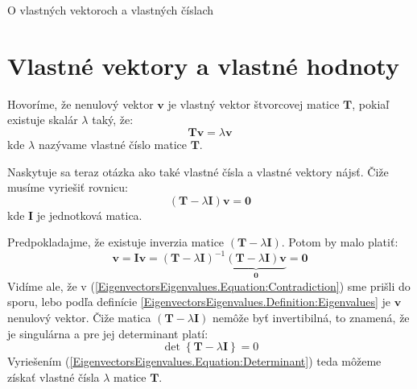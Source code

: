 \documentclass[a4paper, 10pt, ]{article}
\begin{document}
\begin{flushleft}
    O vlastných vektoroch a vlastných číslach
\end{flushleft}

\bigskip

\normalsize
\normalfont

\section{Vlastné vektory a vlastné hodnoty}
\label{EigenvectorsEigenvalues}

\begin{definition}
    \label{EigenvectorsEigenvalues.Definition:Eigenvalues}
    Hovoríme, že nenulový vektor $\bm{v}$ je vlastný vektor štvorcovej matice $\bm{T}$, pokiaľ existuje skalár $\lambda$ taký, že:
    \begin{equation}
        \bm{T} \bm{v} = \lambda \bm{v}
    \end{equation}
    kde $\lambda$ nazývame vlastné číslo matice $\bm{T}$.
\end{definition}

Naskytuje sa teraz otázka ako také vlastné čísla a vlastné vektory nájsť. Čiže musíme vyriešiť rovnicu:
\begin{equation}
    \label{EigenvectorsEigenvalues.Equation:EigenvaluesEquation}
    \left( \bm{T} - \lambda \bm{I} \right) \bm{v} = \bm{0}
\end{equation}
kde $\bm{I}$ je jednotková matica.

Predpokladajme, že existuje inverzia matice $\left( \bm{T} - \lambda \bm{I} \right)$. Potom by malo platiť:
\begin{equation}
    \label{EigenvectorsEigenvalues.Equation:Contradiction}
    \bm{v} = \bm{I} \bm{v} = 
    \left( \bm{T} - \lambda \bm{I} \right)^{-1} \underbrace{\left( \bm{T} - \lambda \bm{I} \right) \bm{v}}_{\bm{0}} = \bm{0}
\end{equation}
Vidíme ale, že v (\ref{EigenvectorsEigenvalues.Equation:Contradiction}) sme prišli do sporu, lebo podľa definície \ref{EigenvectorsEigenvalues.Definition:Eigenvalues} je $\bm{v}$ nenulový vektor. Čiže matica $\left( \bm{T} - \lambda \bm{I} \right)$ nemôže byť invertibilná, to znamená, že je singulárna a pre jej determinant platí:
\begin{equation}
    \label{EigenvectorsEigenvalues.Equation:Determinant}
    \det \left\{ \bm{T} - \lambda \bm{I} \right\} = 0
\end{equation}
Vyriešením (\ref{EigenvectorsEigenvalues.Equation:Determinant}) teda môžeme získať vlastné čísla $\lambda$ matice $\bm{T}$.
\end{document}
